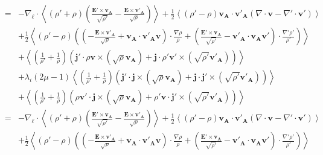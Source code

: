 \begin{eqnarray}
  \label{eq:turb_bi_EL8-11A} &=&- \nabla_{\boldsymbol{\ell}} \cdot \left< \left(\rho' + \rho\right) \left(\frac{ \boldsymbol{E'}\times \boldsymbol{v_A} }{\sqrt{\rho'}} - \frac{ \boldsymbol{E}\times \boldsymbol{v'_A} }{\sqrt{\rho}}\right)\right> +  \frac{1}{2}\left<\left(\rho' - \rho\right) \boldsymbol{v_A} \cdot \boldsymbol{v'_{A}} \left(  \nabla \cdot \boldsymbol{v}-  \nabla' \cdot \boldsymbol{v'}\right)\right> \nonumber\\ 
  &&+\frac{1}{2} \left<\left(\rho' - \rho\right) \left(\left(-\frac{ \boldsymbol{E}\times \boldsymbol{v'_A} }{\sqrt{\rho}} + \boldsymbol{v_A} \cdot \boldsymbol{v'_{A}} \boldsymbol{v}\right) \cdot \frac{\nabla  \rho }{\rho}+\left(\frac{ \boldsymbol{E'}\times \boldsymbol{v_A} }{\sqrt{\rho'}} - \boldsymbol{v'_A} \cdot \boldsymbol{v_{A}} \boldsymbol{v'}\right) \cdot \frac{\nabla'  \rho' }{\rho'}\right)\right> \nonumber\\
        &&+ \left<\left(\frac{1}{\rho'}+ \frac{1}{\rho}\right)\left(  \boldsymbol{j'} \cdot   \rho\boldsymbol{v}  \times \left( \sqrt{\rho}\boldsymbol{v_A}\right) 
        +  \boldsymbol{j} \cdot \rho' \boldsymbol{v'}\times \left( \sqrt{\rho'}\boldsymbol{v'_A}\right)
        \right)\right> \nonumber\\
        &&+ \lambda_i\left(2\mu-1\right) \left<\left(\frac{1}{\rho'}+ \frac{1}{\rho}\right)\left( \boldsymbol{j'} \cdot \boldsymbol{j} \times \left( \sqrt{\rho}\boldsymbol{v_A}\right) + \boldsymbol{j} \cdot  \boldsymbol{j'} \times \left( \sqrt{\rho'}\boldsymbol{v'_A}\right)\right)\right> \nonumber\\
        &&+ \left<\left(\frac{1}{\rho'}+ \frac{1}{\rho}\right)\left( \rho  \boldsymbol{v'} \cdot  \boldsymbol{j}  \times \left( \sqrt{\rho}\boldsymbol{v_A}\right) + \rho' \boldsymbol{v} \cdot  \boldsymbol{j'}\times \left( \sqrt{\rho'}\boldsymbol{v'_A}\right)\right)\right> \nonumber\\
        \label{eq:turb_bi_EL8-11B}&=&- \nabla_{\boldsymbol{\ell}} \cdot \left< \left(\rho' + \rho\right) \left(\frac{ \boldsymbol{E'}\times \boldsymbol{v_A} }{\sqrt{\rho'}} - \frac{ \boldsymbol{E}\times \boldsymbol{v'_A} }{\sqrt{\rho}}\right)\right> +  \frac{1}{2}\left<\left(\rho' - \rho\right) \boldsymbol{v_A} \cdot \boldsymbol{v'_{A}} \left(  \nabla \cdot \boldsymbol{v}-  \nabla' \cdot \boldsymbol{v'}\right)\right> \nonumber\\ 
  &&+\frac{1}{2} \left<\left(\rho' - \rho\right) \left(\left(-\frac{ \boldsymbol{E}\times \boldsymbol{v'_A} }{\sqrt{\rho}} + \boldsymbol{v_A} \cdot \boldsymbol{v'_{A}} \boldsymbol{v}\right) \cdot \frac{\nabla  \rho }{\rho}+\left(\frac{ \boldsymbol{E'}\times \boldsymbol{v_A} }{\sqrt{\rho'}} - \boldsymbol{v'_A} \cdot \boldsymbol{v_{A}} \boldsymbol{v'}\right) \cdot \frac{\nabla'  \rho' }{\rho'}\right)\right> \nonumber\\

\end{eqnarray}
